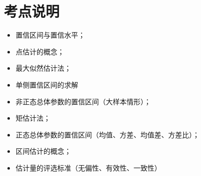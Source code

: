 \section{考点说明}
\begin{itemize}
\item 置信区间与置信水平；
\item 点估计的概念；
\item 最大似然估计法；
\item 单侧置信区间的求解
\item 非正态总体参数的置信区间（大样本情形）；
\item 矩估计法；
\item 正态总体参数的置信区间（均值、方差、均值差、方差比）；
\item 区间估计的概念；
\item 估计量的评选标准（无偏性、有效性、一致性）
\end{itemize}

